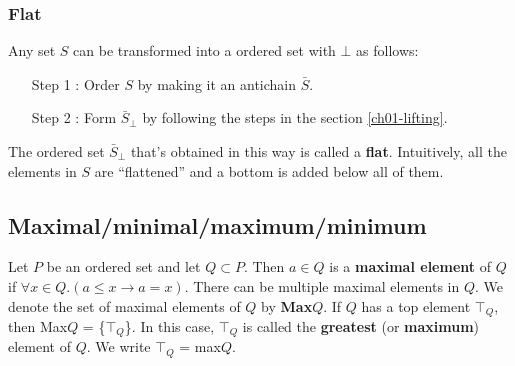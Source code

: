 \documentclass[12pt, letterpaper, oneside]{book}
\begin{document}
\subsubsection{Flat}

Any set $S$ can be transformed into a ordered set with $\bot$ as follows:
\begin{enumerate}
  \item[Step 1]: Order $S$ by making it an antichain $\bar{S}$.
  \item[Step 2]: Form $\bar{S}_{\bot}$ by following the steps in the section \ref{ch01-lifting}.
\end{enumerate}

The ordered set $\bar{S}_{\bot}$ that's obtained in this way is called a \textbf{flat}. Intuitively, all the elements
in $S$ are ``flattened'' and a bottom is added below all of them.


\subsection{Maximal/minimal/maximum/minimum}

Let $P$ be an ordered set and let $Q \subset P$. Then $a \in Q$ is a \textbf{maximal element} of $Q$ if $\forall x \in
  Q. (a \leqslant x \rightarrow a = x)$. There can be multiple maximal elements in $Q$. We denote the set of maximal
elements of $Q$ by \textbf{Max$Q$}. If $Q$ has a top element $\top_{Q}$, then Max$Q$ = \{$\top_{Q}$\}. In this case,
$\top_{Q}$ is called the \textbf{greatest} (or \textbf{maximum}) element of $Q$. We write $\top_{Q}$ = max$Q$.
\end{document}
